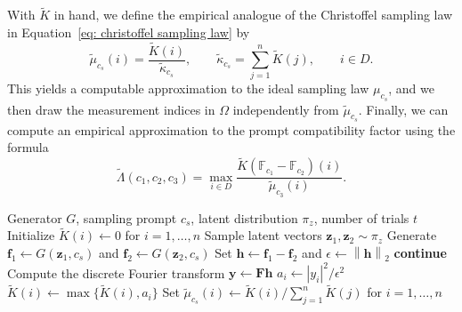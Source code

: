 \documentclass{article}
\theoremstyle{plain}
\theoremstyle{definition}
\theoremstyle{remark}
\begin{document}
With $\widetilde K$ in hand, we define the empirical analogue of the Christoffel sampling law in Equation~\eqref{eq: christoffel sampling law} by
\begin{equation}\label{eq: empirical sampling law}
  \widetilde \mu_{c_s}(i)
  =
  \frac{\widetilde K(i)}{\widetilde \kappa_{c_s}},
  \qquad
  \widetilde \kappa_{c_s}
  =
  \sum_{j=1}^{n} \widetilde K(j),
  \qquad
  i \in D.
\end{equation}
This yields a computable approximation to the ideal sampling law $\mu_{c_s}$, and we then draw the measurement indices in $\Omega$ independently from $\widetilde \mu_{c_s}$. Finally, we can compute an empirical approximation to the prompt compatibility factor using the formula 
\begin{equation}\label{eq: empirical lambda}
 \widetilde\Lambda(c_1,c_2,c_3)
    =
    \max_{i \in D}
    \frac{\widetilde K(\mathbb{F}_{c_1}-\mathbb{F}_{c_2})(i)}{\widetilde \mu_{c_3}(i)}.
\end{equation}

\begin{algorithm}
\caption{Compute $\widetilde{K}$}
\label{alg: ktilde}
\begin{algorithmic}[1]
\REQUIRE Generator $G$, sampling prompt $c_s$, latent distribution $\pi_z$, number of trials $t$
\STATE Initialize $\widetilde K(i)\gets 0$ for $i=1,\dots,n$
    \STATE Sample latent vectors $\mathbf z_1,\mathbf z_2 \sim \pi_z$
    \STATE Generate $\mathbf f_1 \gets G(\mathbf z_1,c_s)$ and $\mathbf f_2 \gets G(\mathbf z_2,c_s)$
    \STATE Set $\mathbf h \gets \mathbf f_1-\mathbf f_2$ and $\epsilon \gets \left\|\mathbf h\right\|_2$
        \STATE \textbf{continue}
    \ENDIF
    \STATE Compute the discrete Fourier transform $\mathbf y \gets \mathbf F \mathbf h$
        \STATE $a_i \gets |y_i|^2 / \epsilon^2$
        \STATE $\widetilde K(i) \gets \max\{\widetilde K(i), a_i\}$
    \ENDFOR
\ENDFOR
\STATE Set $\widetilde \mu_{c_s}(i) \gets \widetilde K(i) / \sum_{j=1}^n \widetilde K(j)$ for $i=1,\dots,n$
\end{algorithmic}
\end{algorithm}
\end{document}
